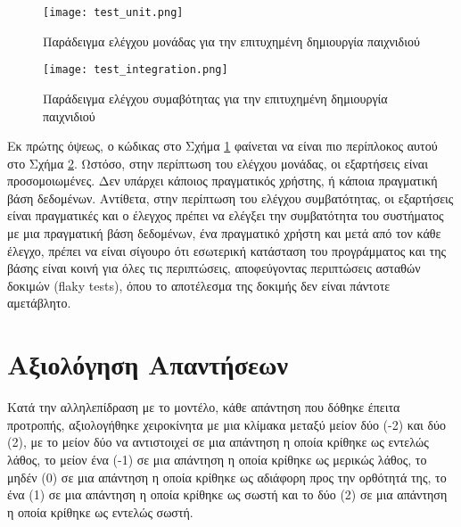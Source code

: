 \begin{figure}[H]
  \begin{center}
    \texttt{[image: test\_unit.png]}
    \caption{Παράδειγμα ελέγχου μονάδας για την επιτυχημένη δημιουργία
    παιχνιδιού}
  \label{fig:TestUnit}
    \end{center}
\end{figure}

\begin{figure}[H]
  \begin{center}
    \texttt{[image: test\_integration.png]}
    \caption{Παράδειγμα ελέγχου συμαβότητας για την επιτυχημένη
    δημιουργία παιχνιδιού}
  \label{fig:TestIntegration}
  \end{center}
\end{figure}

Εκ πρώτης όψεως, ο κώδικας στο Σχήμα \ref{fig:TestUnit} φαίνεται να
είναι πιο περίπλοκος αυτού στο Σχήμα \ref{fig:TestIntegration}. Ωστόσο,
στην περίπτωση του ελέγχου μονάδας, οι εξαρτήσεις είναι προσομοιωμένες.
Δεν υπάρχει κάποιος πραγματικός χρήστης, ή κάποια πραγματική βάση
δεδομένων. Αντίθετα, στην περίπτωση του ελέγχου συμβατότητας, οι
εξαρτήσεις είναι πραγματικές και ο έλεγχος πρέπει να ελέγξει την
συμβατότητα του συστήματος με μια πραγματική βάση δεδομένων, ένα
πραγματικό χρήστη και μετά από τον κάθε έλεγχο, πρέπει να είναι σίγουρο
ότι εσωτερική κατάσταση του προγράμματος και της βάσης είναι κοινή για
όλες τις περιπτώσεις, αποφεύγοντας περιπτώσεις ασταθών δοκιμών
(\textlatin{flaky tests}), όπου το αποτέλεσμα της δοκιμής δεν είναι
πάντοτε αμετάβλητο. \cite{Parry2022}

\section{Αξιολόγηση Απαντήσεων}

Κατά την αλληλεπίδραση με το μοντέλο, κάθε απάντηση που δόθηκε
έπειτα προτροπής, αξιολογήθηκε χειροκίνητα με μια κλίμακα μεταξύ
μείον δύο (-2) και δύο (2), με το μείον δύο να αντιστοιχεί σε μια
απάντηση η οποία κρίθηκε ως εντελώς λάθος, το μείον ένα (-1) σε μια
απάντηση η οποία κρίθηκε ως μερικώς λάθος, το μηδέν (0) σε μια απάντηση
η οποία κρίθηκε ως αδιάφορη προς την ορθότητά της, το ένα (1) σε μια
απάντηση η οποία κρίθηκε ως σωστή και το δύο (2) σε μια απάντηση η οποία
κρίθηκε ως εντελώς σωστή.

